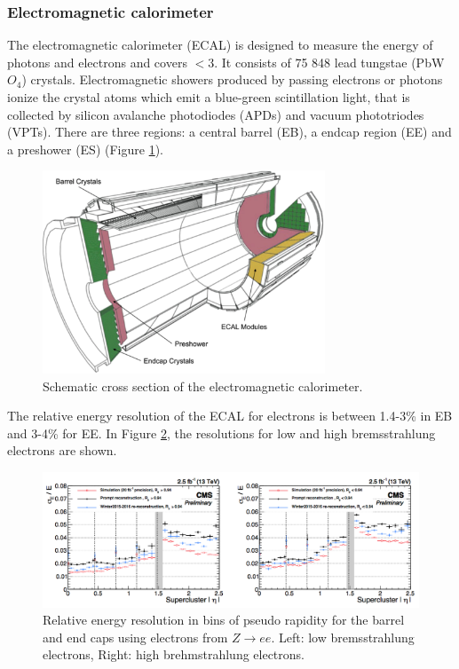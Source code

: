 \subsubsection{Electromagnetic calorimeter}
The electromagnetic calorimeter (ECAL) is designed to measure the energy of photons and electrons and covers \abspsrap $<3$. It consists of 75 848 lead tungstae (PbW$O_4$) crystals. Electromagnetic showers produced by passing electrons or photons ionize the crystal atoms which emit a blue-green scintillation light, that is collected by silicon avalanche photodiodes (APDs) and vacuum phototriodes (VPTs). There are three regions: a central barrel (EB), a endcap region (EE) and a preshower (ES) (Figure \ref{fig:ECAL}). 
\begin{figure}[ht]
	\centering
	\includegraphics[width=0.75\textwidth]{2_ExperimentalSetup/Figures/imageedit_5_8264930617}
	\caption{Schematic cross section of the electromagnetic calorimeter\cite{Chatrchyan:2008aa}.}
	\label{fig:ECAL}
\end{figure}
The relative energy resolution of the ECAL for electrons is between 1.4-3\% in EB and 3-4\% for EE. In Figure \ref{fig:ECALres}, the resolutions for low and high bremsstrahlung electrons are shown. 
\begin{figure}[ht]
	\centering
	\includegraphics[width=\textwidth]{2_ExperimentalSetup/Figures/imageedit_7_5931623976}
	\caption{Relative energy resolution in bins of pseudo rapidity for the barrel and end caps using electrons from $Z \rightarrow ee$. Left: low bremsstrahlung electrons, Right: high brehmstrahlung electrons\cite{Sun:2233637}.}
	\label{fig:ECALres}
\end{figure}

